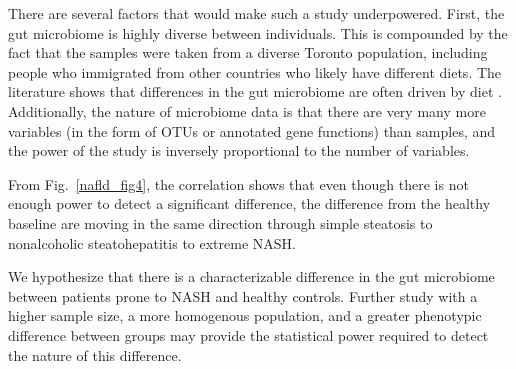 There are several factors that would make such a study underpowered. First, the gut microbiome is highly diverse between individuals. This is compounded by the fact that the samples were taken from a diverse Toronto population, including people who immigrated from other countries who likely have different diets. The literature shows that differences in the gut microbiome are often driven by diet \cite{david2014diet}. Additionally, the nature of microbiome data is that there are very many more variables (in the form of OTUs or annotated gene functions) than samples, and the power of the study is inversely proportional to the number of variables.

From Fig.~\ref{nafld_fig4}, the correlation shows that even though there is not enough power to detect a significant difference, the difference from the healthy baseline are moving in the same direction through simple steatosis to nonalcoholic steatohepatitis to extreme NASH.

We hypothesize that there is a characterizable difference in the gut microbiome between patients prone to NASH and healthy controls. Further study with a higher sample size, a more homogenous population, and a greater phenotypic difference between groups may provide the statistical power required to detect the nature of this difference.
